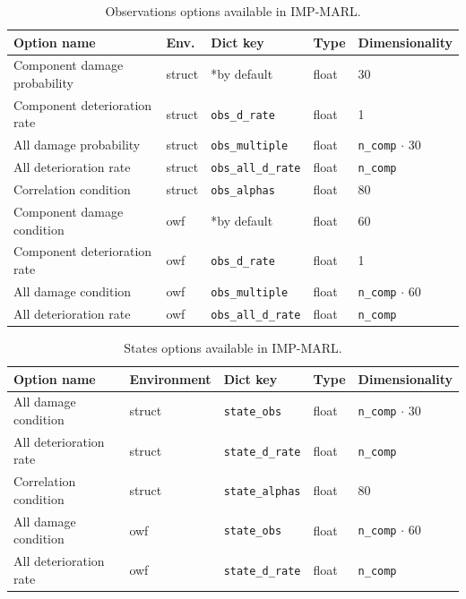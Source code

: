 \begin{table}
\centering
\caption{Observations options available in IMP-MARL.}
\label{tab:obs_desc}
\setlength\tabcolsep{4.5pt}
\begin{tabular}{lllll}
\toprule
Option name & Env. & Dict key & Type &  Dimensionality  \\
\midrule
Component damage probability & struct & *by default & float & 30   \\ 
Component deterioration rate & struct & \texttt{obs\_d\_rate} & float & 1    \\
All damage probability & struct & \texttt{obs\_multiple} & float & \texttt{n\_comp} $\cdot$ 30   \\ 
All deterioration rate & struct & \texttt{obs\_all\_d\_rate} & float &  \texttt{n\_comp}    \\
Correlation condition & struct & \texttt{obs\_alphas} & float & 80    \\
\hline
Component damage condition & owf & *by default & float & 60   \\ 
Component deterioration rate & owf & \texttt{obs\_d\_rate} & float & 1    \\
All damage condition & owf & \texttt{obs\_multiple} & float &  \texttt{n\_comp} $\cdot$ 60  \\ 
All deterioration rate & owf & \texttt{obs\_all\_d\_rate} & float & \texttt{n\_comp}    \\
\bottomrule
\end{tabular}
\end{table}

\begin{table}
\centering
\caption{States options available in IMP-MARL.}
\label{tab:states_desc}
\setlength\tabcolsep{4.5pt}
\begin{tabular}{lllll}
\toprule
Option name & Environment & Dict key & Type & Dimensionality  \\
\midrule
All damage condition & struct & \texttt{state\_obs} & float & \texttt{n\_comp} $\cdot$ 30   \\ 
All deterioration rate & struct &  \texttt{state\_d\_rate} & float & \texttt{n\_comp}    \\
Correlation condition & struct &  \texttt{state\_alphas} & float & 80    \\
\hline
All damage condition & owf & \texttt{state\_obs} & float & \texttt{n\_comp} $\cdot$ 60   \\ 
All deterioration rate & owf & \texttt{state\_d\_rate} & float & \texttt{n\_comp}    \\
\bottomrule
\end{tabular}
\end{table}

